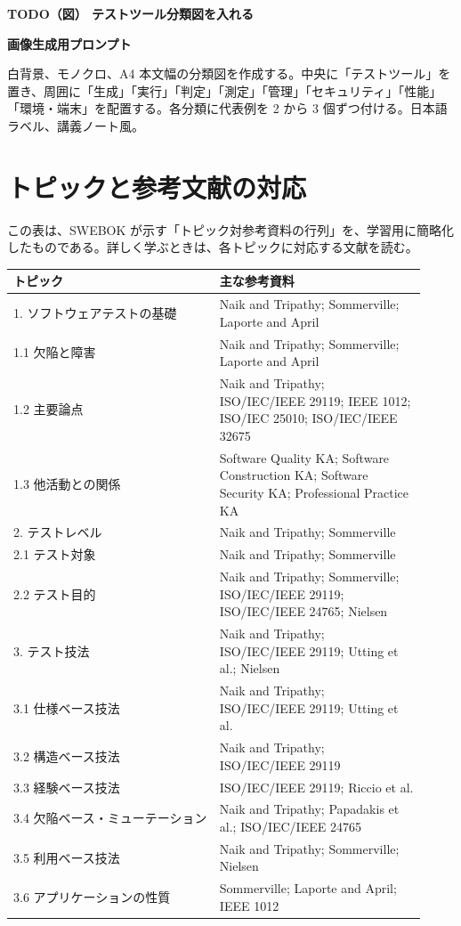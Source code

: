 \documentclass[uplatex,dvipdfmx,a4paper,11pt,nomag]{jsarticle}
\newenvironment{todobox}[2]{\par\medskip\begin{framed}\noindent\textbf{TODO（図） #1}\par\smallskip\noindent\textbf{画像生成用プロンプト}\par\smallskip\noindent #2\par\smallskip}{\end{framed}\par\medskip}
\begin{document}
\begin{todobox}{テストツール分類図を入れる}{白背景、モノクロ、A4 本文幅の分類図を作成する。中央に「テストツール」を置き、周囲に「生成」「実行」「判定」「測定」「管理」「セキュリティ」「性能」「環境・端末」を配置する。各分類に代表例を 2 から 3 個ずつ付ける。日本語ラベル、講義ノート風。}
\end{todobox}

\section{トピックと参考文献の対応}
この表は、SWEBOK が示す「トピック対参考資料の行列」を、学習用に簡略化したものである。詳しく学ぶときは、各トピックに対応する文献を読む。

\begin{longtable}{P{0.46\linewidth}P{0.46\linewidth}}
\toprule
\textbf{トピック} & \textbf{主な参考資料} \\
. ソフトウェアテストの基礎 & Naik and Tripathy; Sommerville; Laporte and April \\
1.1 欠陥と障害 & Naik and Tripathy; Sommerville; Laporte and April \\
1.2 主要論点 & Naik and Tripathy; ISO/IEC/IEEE 29119; IEEE 1012; ISO/IEC 25010; ISO/IEC/IEEE 32675 \\
1.3 他活動との関係 & Software Quality KA; Software Construction KA; Software Security KA; Professional Practice KA \\
2. テストレベル & Naik and Tripathy; Sommerville \\
2.1 テスト対象 & Naik and Tripathy; Sommerville \\
2.2 テスト目的 & Naik and Tripathy; Sommerville; ISO/IEC/IEEE 29119; ISO/IEC/IEEE 24765; Nielsen \\
3. テスト技法 & Naik and Tripathy; ISO/IEC/IEEE 29119; Utting et al.; Nielsen \\
3.1 仕様ベース技法 & Naik and Tripathy; ISO/IEC/IEEE 29119; Utting et al. \\
3.2 構造ベース技法 & Naik and Tripathy; ISO/IEC/IEEE 29119 \\
3.3 経験ベース技法 & ISO/IEC/IEEE 29119; Riccio et al. \\
3.4 欠陥ベース・ミューテーション & Naik and Tripathy; Papadakis et al.; ISO/IEC/IEEE 24765 \\
3.5 利用ベース技法 & Naik and Tripathy; Sommerville; Nielsen \\
3.6 アプリケーションの性質 & Sommerville; Laporte and April; IEEE 1012 \\

\end{longtable}
\end{document}
